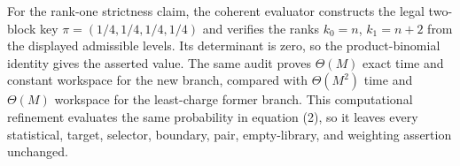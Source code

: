 For the rank-one strictness claim, the coherent evaluator constructs the legal two-block key \(\pi=(1/4,1/4,1/4,1/4)\) and verifies the ranks \(k_0=n\), \(k_1=n+2\) from the displayed admissible levels. Its determinant is zero, so the product-binomial identity gives the asserted value. The same audit proves \(\Theta(M)\) exact time and constant workspace for the new branch, compared with \(\Theta(M^2)\) time and \(\Theta(M)\) workspace for the least-charge former branch. This computational refinement evaluates the same probability in equation (2), so it leaves every statistical, target, selector, boundary, pair, empty-library, and weighting assertion unchanged.